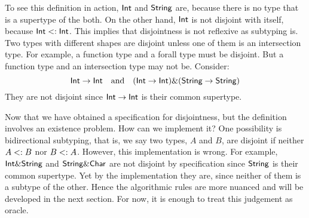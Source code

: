 To see this definition in action, $\textsf{Int}$ and $\textsf{String}$ are, because there is
no type that is a supertype of the both. On the other hand, $\textsf{Int}$ is not
disjoint with itself, because $\textsf{Int} <: \textsf{Int}$. This implies that
disjointness is not reflexive as subtyping is. Two types with different shapes
are disjoint unless one of them is an intersection type. For example, a function
type and a forall type must be disjoint. But a function type and an intersection
type may not be. Consider:
\[ \textsf{Int} \to \textsf{Int} \quad \text{and} \quad (\textsf{Int} \to \textsf{Int}) \& (\textsf{String} \to \textsf{String}) \]
They are not disjoint since $\textsf{Int} \to \textsf{Int}$ is their common supertype.

Now that we have obtained a specification for disjointness, but the definition
involves an existence problem. How can we implement it? One possibility is
bidirectional subtyping, that is, we say two types, $A$ and $B$, are disjoint if
neither $A <: B$ nor $B <: A$. However, this implementation is
wrong. For example, $\textsf{Int} \& \textsf{String}$ and $\textsf{String} \& \textsf{Char}$ are
not disjoint by specification since $\textsf{String}$ is their common supertype. Yet
by the implementation they are, since neither of them is a subtype of the other.
Hence the algorithmic rules are more nuanced and will be developed in the next
section. For now, it is enough to treat this judgement as oracle.


%
%
%

